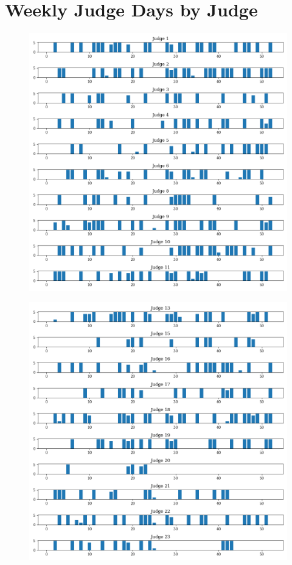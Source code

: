 \documentclass[11pt]{article}
\begin{document}
\section{Weekly Judge Days by Judge}
  \begin{figure}[H]
    \centering
    \includegraphics[width=\textwidth]{../../../output/figures/Exploration/JudgeID_weekly_judge_days_0}
  \end{figure}

  \begin{figure}[H]
    \centering
    \includegraphics[width=\textwidth]{../../../output/figures/Exploration/JudgeID_weekly_judge_days_1}
  \end{figure}
\end{document}
